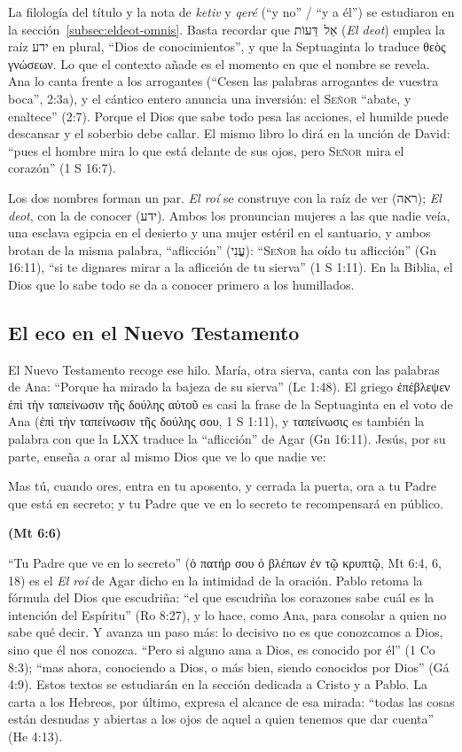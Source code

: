 \documentclass[11pt,letterpaper]{article}
\newcommand{\heb}[1]{\mbox{\foreignlanguage{hebrew}{#1}}}
\newcommand{\grc}[1]{\foreignlanguage{ancientgreek}{#1}}
\newcommand{\SENOR}{\textsc{Señor}}
\newcommand{\fuente}[1]{\par\hfill{\upshape\bfseries\small\textcolor{azul}{#1}}}
\begin{document}
La filología del título y la nota de \emph{ketiv} y \emph{qeré} (``y no'' / ``y a él'') se estudiaron en la sección~\ref{subsec:eldeot-omnis}. Basta recordar que \heb{אֵל דֵּעוֹת} (\emph{El deot}) emplea la raíz \heb{ידע} en plural, ``Dios de conocimientos'', y que la Septuaginta lo traduce \grc{θεὸς γνώσεων}. Lo que el contexto añade es el momento en que el nombre se revela. Ana lo canta frente a los arrogantes (``Cesen las palabras arrogantes de vuestra boca'', 2:3a), y el cántico entero anuncia una inversión: el \SENOR{} ``abate, y enaltece'' (2:7). Porque el Dios que sabe todo pesa las acciones, el humilde puede descansar y el soberbio debe callar. El mismo libro lo dirá en la unción de David: ``pues el hombre mira lo que está delante de sus ojos, pero \SENOR{} mira el corazón'' (1 S 16:7).

Los dos nombres forman un par. \emph{El roí} se construye con la raíz de ver (\heb{ראה}); \emph{El deot}, con la de conocer (\heb{ידע}). Ambos los pronuncian mujeres a las que nadie veía, una esclava egipcia en el desierto y una mujer estéril en el santuario, y ambos brotan de la misma palabra, ``aflicción'' (\heb{עֳנִי}): ``\SENOR{} ha oído tu aflicción'' (Gn 16:11), ``si te dignares mirar a la aflicción de tu sierva'' (1 S 1:11). En la Biblia, el Dios que lo sabe todo se da a conocer primero a los humillados.

\subsection{El eco en el Nuevo Testamento}

El Nuevo Testamento recoge ese hilo. María, otra sierva, canta con las palabras de Ana: ``Porque ha mirado la bajeza de su sierva'' (Lc 1:48). El griego \grc{ἐπέβλεψεν ἐπὶ τὴν ταπείνωσιν τῆς δούλης αὐτοῦ} es casi la frase de la Septuaginta en el voto de Ana (\grc{ἐπὶ τὴν ταπείνωσιν τῆς δούλης σου}, 1 S 1:11), y \grc{ταπείνωσις} es también la palabra con que la LXX traduce la ``aflicción'' de Agar (Gn 16:11). Jesús, por su parte, enseña a orar al mismo Dios que ve lo que nadie ve:

\begin{cita}Mas tú, cuando ores, entra en tu aposento, y cerrada la puerta, ora a tu Padre que está en secreto; y tu Padre que ve en lo secreto te recompensará en público.\fuente{(Mt 6:6)}\end{cita}

``Tu Padre que ve en lo secreto'' (\grc{ὁ πατήρ σου ὁ βλέπων ἐν τῷ κρυπτῷ}, Mt 6:4, 6, 18) es el \emph{El roí} de Agar dicho en la intimidad de la oración. Pablo retoma la fórmula del Dios que escudriña: ``el que escudriña los corazones sabe cuál es la intención del Espíritu'' (Ro 8:27), y lo hace, como Ana, para consolar a quien no sabe qué decir. Y avanza un paso más: lo decisivo no es que conozcamos a Dios, sino que él nos conozca. ``Pero si alguno ama a Dios, es conocido por él'' (1 Co 8:3); ``mas ahora, conociendo a Dios, o más bien, siendo conocidos por Dios'' (Gá 4:9). Estos textos se estudiarán en la sección dedicada a Cristo y a Pablo. La carta a los Hebreos, por último, expresa el alcance de esa mirada: ``todas las cosas están desnudas y abiertas a los ojos de aquel a quien tenemos que dar cuenta'' (He 4:13).
\end{document}
